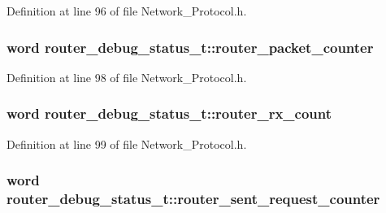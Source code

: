 Definition at line 96 of file Network\-\_\-\-Protocol.\-h.

\hypertarget{structrouter__debug__status__t_a6b8870662b1b6101fae1f02affaacba2}{
\subsubsection[{router\-\_\-packet\-\_\-counter}]{\setlength{\rightskip}{0pt plus 5cm}word router\-\_\-debug\-\_\-status\-\_\-t\-::router\-\_\-packet\-\_\-counter}}\label{structrouter__debug__status__t_a6b8870662b1b6101fae1f02affaacba2}


Definition at line 98 of file Network\-\_\-\-Protocol.\-h.

\hypertarget{structrouter__debug__status__t_a3df592dbcfba21944aed494410a50c7b}{
\subsubsection[{router\-\_\-rx\-\_\-count}]{\setlength{\rightskip}{0pt plus 5cm}word router\-\_\-debug\-\_\-status\-\_\-t\-::router\-\_\-rx\-\_\-count}}\label{structrouter__debug__status__t_a3df592dbcfba21944aed494410a50c7b}


Definition at line 99 of file Network\-\_\-\-Protocol.\-h.

\hypertarget{structrouter__debug__status__t_a541c3cf0fdae35ca720292c970d50d80}{
\subsubsection[{router\-\_\-sent\-\_\-request\-\_\-counter}]{\setlength{\rightskip}{0pt plus 5cm}word router\-\_\-debug\-\_\-status\-\_\-t\-::router\-\_\-sent\-\_\-request\-\_\-counter}}\label{structrouter__debug__status__t_a541c3cf0fdae35ca720292c970d50d80}


